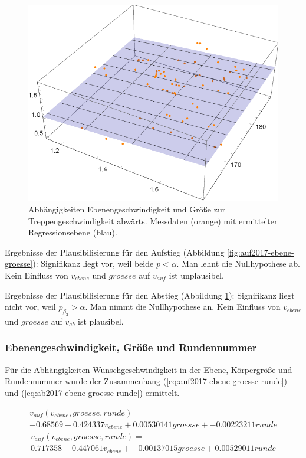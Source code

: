 \begin{figure} \centering 
	\includegraphics[]{abbildungen/regression/2017/ab-ebene-groesse.pdf}
	
	\caption{Abhängigkeiten Ebenengeschwindigkeit und Größe zur Treppengeschwindigkeit abwärts. Messdaten (orange) mit ermittelter Regressionsebene (blau). \label{fig:ab2017-ebene-groesse}}
\end{figure}

Ergebnisse der Plausibilisierung für den Aufstieg
(Abbildung \ref{fig:auf2017-ebene-groesse}):
Signifikanz liegt vor, weil beide $p < \alpha$. Man lehnt die
Nullhypothese ab. Kein Einfluss von $v_{ebene}$ und $groesse$ auf $v_{auf}$ ist unplausibel.

Ergebnisse der Plausibilisierung für den Abstieg
(Abbildung \ref{fig:ab2017-ebene-groesse}):
Signifikanz liegt nicht vor, weil $p_{\beta_2} > \alpha$. Man nimmt die
Nullhypothese an. Kein Einfluss von $v_{ebene}$ und $groesse$ auf $v_{ab}$ ist plausibel.


\subsubsection{Ebenengeschwindigkeit, Größe und Rundennummer}

Für die Abhängigkeiten Wunschgeschwindigkeit in der Ebene, Körpergröße und Rundennummer wurde 
der Zusammenhang (\ref{eq:auf2017-ebene-groesse-runde}) und (\ref{eq:ab2017-ebene-groesse-runde}) ermittelt.

\begin{multline} \label{eq:auf2017-ebene-groesse-runde}
v_{auf}(v_{ebene}, groesse, runde) = \\
-0.68569 + 0.424337 v_{ebene} + 0.00530141 groesse + -0.00223211 runde
\end{multline}
\begin{multline} \label{eq:ab2017-ebene-groesse-runde}
v_{auf}(v_{ebene}, groesse, runde) = \\
0.717358 + 0.447061 v_{ebene} + -0.00137015 groesse + 0.00529011 runde
\end{multline}

